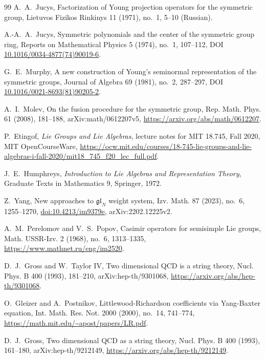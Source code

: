 \documentclass[11pt]{amsart}
\theoremstyle{definition}
\theoremstyle{remark}
\begin{document}
\begin{thebibliography}{99}
A.~A.~Jucys, Factorization of Young projection operators for the symmetric
group, Lietuvos Fizikos Rinkinys 11 (1971), no.~1, 5--10 (Russian).

A.-A.~A.~Jucys, Symmetric polynomials and the center of the symmetric group
ring, Reports on Mathematical Physics 5 (1974), no.~1, 107--112,
DOI \href{https://doi.org/10.1016/0034-4877(74)90019-6}{10.1016/0034-4877(74)90019-6}.

G.~E.~Murphy, A new construction of Young's seminormal representation of
the symmetric groups, Journal of Algebra 69 (1981), no.~2, 287--297,
DOI \href{https://doi.org/10.1016/0021-8693(81)90205-2}{10.1016/0021-8693(81)90205-2}.

A.~I.~Molev, On the fusion procedure for the symmetric group,
Rep. Math. Phys. 61 (2008), 181--188, arXiv:math/0612207v5,
\url{https://arxiv.org/abs/math/0612207}.

P.~Etingof, \emph{Lie Groups and Lie Algebras}, lecture notes for MIT 18.745,
Fall 2020, MIT OpenCourseWare,
\url{https://ocw.mit.edu/courses/18-745-lie-groups-and-lie-algebras-i-fall-2020/mit18_745_f20_lec_full.pdf}.

J.~E.~Humphreys, \emph{Introduction to Lie Algebras and Representation Theory},
Graduate Texts in Mathematics 9, Springer, 1972.

Z.~Yang, New approaches to \(\mathfrak{gl}_N\) weight system,
Izv. Math. 87 (2023), no.~6, 1255--1270,
\href{https://doi.org/10.4213/im9379e}{doi:10.4213/im9379e},
arXiv:2202.12225v2.

A.~M.~Perelomov and V.~S.~Popov, Casimir operators for semisimple Lie groups,
Math. USSR-Izv. 2 (1968), no.~6, 1313--1335,
\url{https://www.mathnet.ru/eng/im2520}.

D.~J.~Gross and W.~Taylor IV, Two dimensional QCD is a string theory,
Nucl. Phys. B 400 (1993), 181--210, arXiv:hep-th/9301068,
\url{https://arxiv.org/abs/hep-th/9301068}.

O.~Gleizer and A.~Postnikov, Littlewood-Richardson coefficients via
Yang-Baxter equation, Int. Math. Res. Not. 2000 (2000), no.~14, 741--774,
\url{https://math.mit.edu/~apost/papers/LR.pdf}.

D.~J.~Gross, Two dimensional QCD as a string theory, Nucl. Phys. B 400
(1993), 161--180, arXiv:hep-th/9212149,
\url{https://arxiv.org/abs/hep-th/9212149}.


\end{thebibliography}
\end{document}
